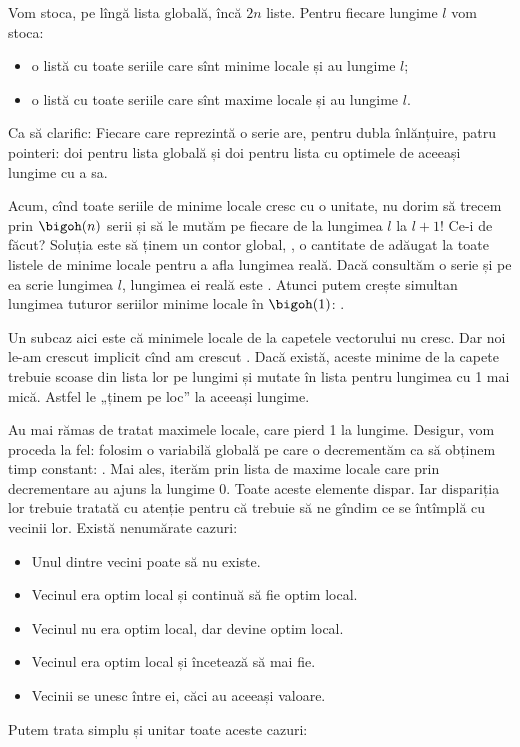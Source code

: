 Vom stoca, pe lîngă lista globală, încă $2n$ liste. Pentru fiecare lungime $l$ vom stoca:

\begin{itemize}
  \item o listă cu toate seriile care sînt minime locale și au lungime $l$;
  \item o listă cu toate seriile care sînt maxime locale și au lungime $l$.
\end{itemize}

Ca să clarific: Fiecare  care reprezintă o serie are, pentru dubla înlănțuire, patru pointeri: doi pentru lista globală și doi pentru lista cu optimele de aceeași lungime cu a sa.

Acum, cînd toate seriile de minime locale cresc cu o unitate, nu dorim să trecem prin $\bigoh(n)$ serii și să le mutăm pe fiecare de la lungimea $l$ la $l+1$! Ce-i de făcut? Soluția este să ținem un contor global, , o cantitate de adăugat la toate listele de minime locale pentru a afla lungimea reală. Dacă consultăm o serie și pe ea scrie lungimea $l$, lungimea ei reală este . Atunci putem crește simultan lungimea tuturor seriilor minime locale în $\bigoh(1)$: .

Un subcaz aici este că minimele locale de la capetele vectorului nu cresc. Dar noi le-am crescut implicit cînd am crescut . Dacă există, aceste minime de la capete trebuie scoase din lista lor pe lungimi și mutate în lista pentru lungimea cu 1 mai mică. Astfel le „ținem pe loc” la aceeași lungime.

Au mai rămas de tratat maximele locale, care pierd 1 la lungime. Desigur, vom proceda la fel: folosim o variabilă globală pe care o decrementăm ca să obținem timp constant: . Mai ales, iterăm prin lista de maxime locale care prin decrementare au ajuns la lungime 0. Toate aceste elemente dispar. Iar dispariția lor trebuie tratată cu atenție pentru că trebuie să ne gîndim ce se întîmplă cu vecinii lor. Există nenumărate cazuri:

\begin{itemize}
  \item Unul dintre vecini poate să nu existe.
  \item Vecinul era optim local și continuă să fie optim local.
  \item Vecinul nu era optim local, dar devine optim local.
  \item Vecinul era optim local și încetează să mai fie.
  \item Vecinii se unesc între ei, căci au aceeași valoare.
\end{itemize}
Putem trata simplu și unitar toate aceste cazuri:

